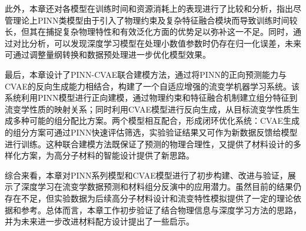 此外，本章还对各模型在训练时间和资源消耗上的表现进行了比较和分析，指出尽管理论上PINN类模型由于引入了物理约束及复杂特征融合模块而导致训练时间较长，但其在捕捉复杂物理特性和有效泛化方面的优势足以弥补这一不足。同时，通过对比分析，可以发现深度学习模型在处理小数值参数时仍存在归一化误差，未来可通过调整量纲转换和数据预处理进一步优化模型效果。

最后，本章设计了PINN-CVAE联合建模方法，通过将PINN的正向预测能力与CVAE的反向生成能力相结合，构建了一个自适应增强的流变学机器学习系统。该系统利用PINN模型进行正向建模，通过物理约束和特征融合机制建立组分特征到流变学性质的映射关系；同时利用CVAE模型进行反向生成，从目标流变学性质生成多种可能的组分配比方案。两个模型相互配合，形成闭环优化系统：CVAE生成的组分方案可通过PINN快速评估筛选，实验验证结果又可作为新数据反馈给模型进行训练。这种联合建模方法既保证了预测的物理合理性，又提供了材料设计的多样化方案，为高分子材料的智能设计提供了新思路。

综合来看，本章对PINN系列模型和CVAE模型进行了初步构建、改进与验证，展示了深度学习在流变学数据预测和材料组分反演中的应用潜力。虽然目前的结果仍存在不足，但实验数据为后续高分子材料设计和流变特性模拟提供了一定的理论依据和参考。总体而言，本章工作初步验证了结合物理信息与深度学习方法的思路，并为未来进一步改进材料配方设计提出了一些启示。
